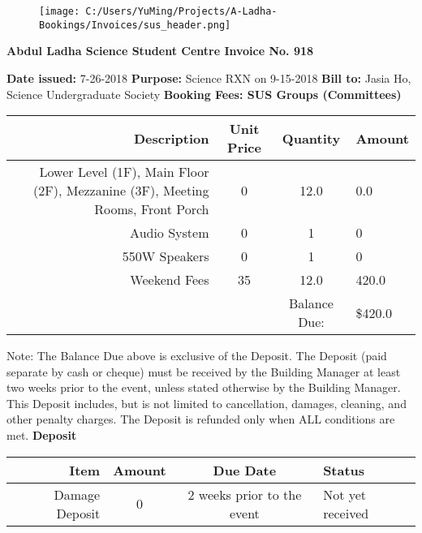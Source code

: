 \documentclass{article}%
\begin{document}
%
\normalsize%
\noindent%


\begin{figure}[h!]%
\centering%
\centering%
\texttt{[image: C:/Users/YuMing/Projects/A-Ladha-Bookings/Invoices/sus\_header.png]}%
\end{figure}

%
\begin{center}%
\textbf{Abdul Ladha Science Student Centre Invoice No. 918}%
\end{center}%
\textbf{ }%
\newline%
\textbf{Date issued: }%
7{-}26{-}2018%
\newline%
\textbf{Purpose: }%
Science RXN on 9{-}15{-}2018%
\newline%
\textbf{Bill to: }%
Jasia Ho, Science Undergraduate Society%
\newline%
\newline%
\textbf{Booking Fees: SUS Groups (Committees)}%
\newline%
\begin{tabular}{|r|ccl|}%
\hline%
Description&Unit Price&Quantity&Amount\\%
\hline%
Lower Level (1F), Main Floor (2F), Mezzanine (3F), Meeting Rooms, Front Porch&0&12.0&0.0\\%
\hline%
Audio System&0&1&0\\%
\hline%
550W Speakers&0&1&0\\%
\hline%
Weekend Fees&35&12.0&420.0\\%
\hline%
&&Balance Due:&\$420.0\\%
\hline%
\end{tabular}%
\newline%
\newline%
Note: The Balance Due above is exclusive of the Deposit.         The Deposit (paid separate by cash or cheque) must be received by the Building Manager         at least two weeks prior to the event, unless stated otherwise by the Building Manager.         This Deposit includes, but is not limited to cancellation, damages, cleaning, and other penalty charges.         The Deposit is refunded only when ALL conditions are met.%
\newline%
\newline%
\textbf{Deposit}%
\newline%
\begin{tabular}{|r|c|c|l|}%
\hline%
Item&Amount&Due Date&Status\\%
\hline%
Damage Deposit&0&2 weeks prior to the event&Not yet received\\%
\hline%
\end{tabular}%
\end{document}
